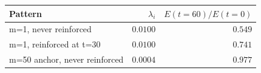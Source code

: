 \begin{tabular}{@{}lrr@{}}
\toprule
Pattern & $\lambda_i$ & $E(t{=}60)/E(t{=}0)$ \\
\midrule
m=1, never reinforced & $0.0100$ & $0.549$ \\
m=1, reinforced at t=30 & $0.0100$ & $0.741$ \\
m=50 anchor, never reinforced & $0.0004$ & $0.977$ \\
\bottomrule
\end{tabular}
